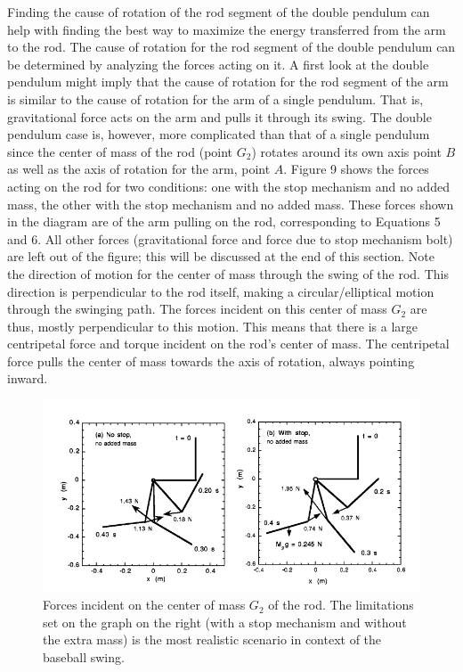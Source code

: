 \documentclass[%
 aip,
 amsmath,amssymb,
 reprint,%
 floatfix,%
]{revtex4-1}
\begin{document}
Finding the cause of rotation of the rod segment of the double pendulum can help with finding the best way to maximize the energy transferred from the arm to the rod. The cause of rotation for the rod segment of the double pendulum can be determined by analyzing the forces acting on it. A first look at the double pendulum might imply that the cause of rotation for the rod segment of the arm is similar to the cause of rotation for the arm of a single pendulum. That is, gravitational force acts on the arm and pulls it through its swing. The double pendulum case is, however, more complicated than that of a single pendulum since the center of mass of the rod (point $G_2$) rotates around its own axis point $B$ as well as the axis of rotation for the arm, point $A$. Figure 9 shows the forces acting on the rod for two conditions: one with the stop mechanism and no added mass, the other with the stop mechanism and no added mass. These forces shown in the diagram are of the arm pulling on the rod, corresponding to Equations 5 and 6. All other forces (gravitational force and force due to stop mechanism bolt) are left out of the figure; this will be discussed at the end of this section. Note the direction of motion for the center of mass through the swing of the rod. This direction is perpendicular to the rod itself, making a circular/elliptical motion through the swinging path. The forces incident on this center of mass $G_2$ are thus, mostly perpendicular to this motion. This means that there is a large centripetal force and torque incident on the rod's center of mass. The centripetal force pulls the center of mass towards the axis of rotation, always pointing inward.

\begin{figure}[H]
	\centering
	\includegraphics[scale=0.3]{torque.png}
	\caption{Forces incident on the center of mass $G_2$ of the rod. The limitations set on the graph on the right (with a stop mechanism and without the extra mass) is the most realistic scenario in context of the baseball swing.}
\end{figure}
\end{document}
